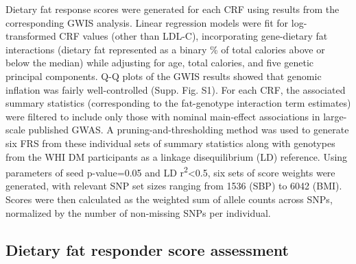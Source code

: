 \documentclass[]{article}
\begin{document}
Dietary fat response scores were generated for each CRF using results
from the corresponding GWIS analysis. Linear regression models were fit
for log-transformed CRF values (other than LDL-C), incorporating
gene-dietary fat interactions (dietary fat represented as a binary \% of
total calories above or below the median) while adjusting for age, total
calories, and five genetic principal components. Q-Q plots of the GWIS
results showed that genomic inflation was fairly well-controlled (Supp.
Fig. S1). For each CRF, the associated summary statistics (corresponding
to the fat-genotype interaction term estimates) were filtered to include
only those with nominal main-effect associations in large-scale
published GWAS. A pruning-and-thresholding method was used to generate
six FRS from these individual sets of summary statistics along with
genotypes from the WHI DM participants as a linkage disequilibrium (LD)
reference. Using parameters of seed p-value=0.05 and LD
r\textsuperscript{2}\textless{}0.5, six sets of score weights were
generated, with relevant SNP set sizes ranging from 1536 (SBP) to 6042
(BMI). Scores were then calculated as the weighted sum of allele counts
across SNPs, normalized by the number of non-missing SNPs per
individual.

\hypertarget{dietary-fat-responder-score-assessment}{%
\subsection{Dietary fat responder score
assessment}\label{dietary-fat-responder-score-assessment}}
\end{document}
